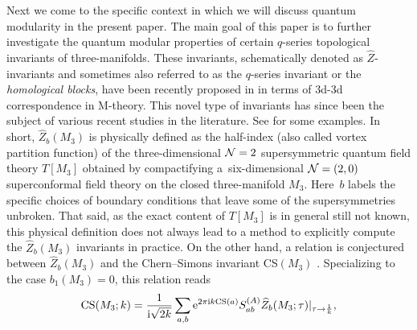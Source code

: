 \documentclass[10pt,a4paper]{amsart}
\theoremstyle{definition}
\numberwithin{equation}{section}
\begin{document}
Next we come to the specific context in which we will discuss quantum modularity in the present paper. The main goal of this paper is to further investigate the quantum modular properties of certain $q$-series topological invariants of three-manifolds. These invariants, schematically denoted as $\widehat Z$-invariants and sometimes also referred to as the $q$-series invariant or the {\it homological blocks}, have been recently proposed in \cite{Gukov:2017kmk,Gukov:2016gkn} in terms of 3d-3d correspondence in M-theory.
This novel type of invariants has since been the subject of various recent studies in the literature. See \cite{Chauhan:2022cni,chengUpC,cheng20193d,
Chung:2018rea, Chung:2019jgw, Chung:2020efy, Chung:2022ypb,
Ekholm:2020lqy,2018arXiv181105376E, Ferrari:2020avq, Gukov:2020frk, Matsusaka:2021vbw, Murakami:2023oam,Park:2019xey, Park:2021ufu} for some examples.
In short, $\widehat Z_b(M_3)$ is physically defined as the half-index (also called vortex partition function) of the three-dimensional ${\cal N}=2$ supersymmetric quantum field theory $T[M_3]$ obtained by compactifying a~six-dimensional ${\cal N}=(2,0)$ superconformal field theory on the closed three-manifold $M_3$. Here~$b$ labels the specific choices of boundary conditions that leave some of the supersymmetries unbroken. That said,
as the exact content of $T[M_3]$ is in general still not known, this physical definition does not always lead to a method to explicitly compute the $\widehat Z_b(M_3)$ invariants in practice. On the other hand, a relation is conjectured between $\widehat Z_b(M_3)$ and the Chern--Simons invariant {CS$(M_3)$}
\cite{Gukov:2017kmk}. Specializing to the case $b_1(M_3)=0$, this relation reads
\begin{equation}
\label{ZhatfromCS-SU2-intro}
 \mathrm{CS}(M_3;k) = \frac{1}{{\rm i}\sqrt{2k}}
 \sum_{a,b }
 {\rm e}^{2\pi {\rm i} k {\rm CS}(a) }
 S_{ab}^{(A)} \widehat{Z}_b ( M_3 ; \tau)\lvert_{\tau \to \frac{1}{k}},
\end{equation}
\end{document}
